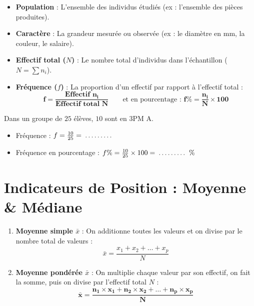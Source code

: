 \begin{cadredef}
\begin{itemize}[leftmargin=1.5em, itemsep=2pt]
    \item \textbf{Population} : L'ensemble des individus étudiés (ex : l'ensemble des pièces produites).
    \item \textbf{Caractère} : La grandeur mesurée ou observée (ex : le diamètre en mm, la couleur, le salaire).
    \item \textbf{Effectif total ($N$)} : Le nombre total d'individus dans l'échantillon ($N = \sum n_i$).
    \item \textbf{Fréquence ($f$)} : La proportion d'un effectif par rapport à l'effectif total :
    \[ \mathbf{f = \frac{\text{Effectif } n_i}{\text{Effectif total } N}} \qquad \text{et en pourcentage : } \mathbf{f\% = \frac{n_i}{N} \times 100} \]
\end{itemize}
\end{cadredef}

\begin{cadreexemple}
Dans un groupe de $25$ élèves, $10$ sont en 3PM A.
\begin{itemize}[leftmargin=1.5em, itemsep=2pt]
    \item Fréquence : $f = \frac{10}{25} = \pointille[1.5cm]$
    \item Fréquence en pourcentage : $f\% = \frac{10}{25} \times 100 = \pointille[1.5cm] \text{ \%}$
\end{itemize}
\end{cadreexemple}

\section{Indicateurs de Position : Moyenne \& Médiane}

\begin{cadremethode}
\begin{enumerate}[leftmargin=1.5em, itemsep=3pt]
    \item \textbf{Moyenne simple $\bar{x}$} : On additionne toutes les valeurs et on divise par le nombre total de valeurs :
    \[ \bar{x} = \frac{x_1 + x_2 + \dots + x_p}{N} \]
    \item \textbf{Moyenne pondérée $\bar{x}$} : On multiplie chaque valeur par son effectif, on fait la somme, puis on divise par l'effectif total $N$ :
    \[ \mathbf{\bar{x} = \frac{n_1 \times x_1 + n_2 \times x_2 + \dots + n_p \times x_p}{N}} \]
\end{enumerate}
\end{cadremethode}

